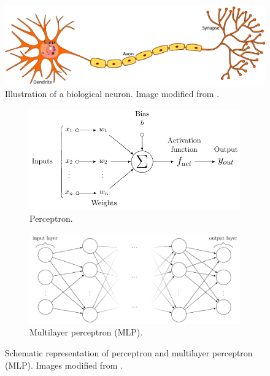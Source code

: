 \begin{figure}[htb!]
	\centering
	\includegraphics[width=\textwidth]{images/background/Neuron.pdf}
	\caption[Illustration of a biological neuron]{Illustration of a biological neuron. Image modified from \cite{Neuron}.}
	\label{fig:neuron}
\end{figure}
\begin{figure}[htb!]
	\centering
	\begin{subfigure}[b]{0.8\textwidth}
		\centering
		\includegraphics[width=\textwidth,keepaspectratio]{images/background/perceptron_perfect.pdf}
		\caption{Perceptron.}
		\label{fig:perceptron}
	\end{subfigure}
	\hfill
	\begin{subfigure}[b]{\textwidth}
		\centering
		\includegraphics[width=\textwidth,keepaspectratio]{images/background/MLP.pdf}
		\caption{Multilayer perceptron (MLP).}
		\label{fig:MLP}
	\end{subfigure}
	
	\caption[Schematic representation of perceptron and multilayer perceptron]{Schematic representation of perceptron and multilayer perceptron (MLP). Images modified from \cite{Perceptrontex, MLPtex}.}
	\label{fig:percetron-mlp}
\end{figure}

